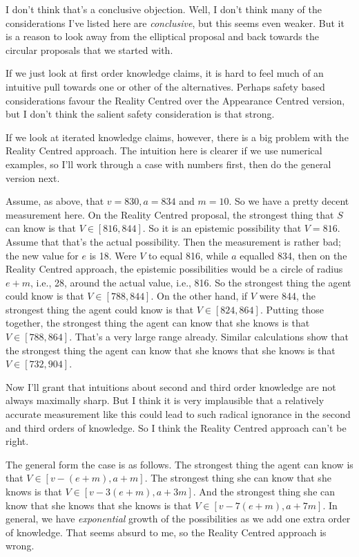 I don't think that's a conclusive objection. Well, I don't think many of the considerations I've listed here are \textit{conclusive}, but this seems even weaker. But it is a reason to look away from the elliptical proposal and back towards the circular proposals that we started with.

If we just look at first order knowledge claims, it is hard to feel much of an intuitive pull towards one or other of the alternatives. Perhaps safety based considerations favour the Reality Centred over the Appearance Centred version, but I don't think the salient safety consideration is that strong.

If we look at iterated knowledge claims, however, there is a big problem with the Reality Centred approach. The intuition here is clearer if we use numerical examples, so I'll work through a case with numbers first, then do the general version next.

Assume, as above, that $v = 830, a = 834$ and $m = 10$. So we have a pretty decent measurement here. On the Reality Centred proposal, the strongest thing that $S$ can know is that $V \in [816, 844]$. So it is an epistemic possibility that $V = 816$. Assume that that's the actual possibility. Then the measurement is rather bad; the new value for $e$ is 18. Were $V$ to equal 816, while $a$ equalled 834, then on the Reality Centred approach, the epistemic possibilities would be a circle of radius $e+m$, i.e., 28, around the actual value, i.e., 816. So the strongest thing the agent could know is that $V \in [788, 844]$. On the other hand, if $V$ were 844, the strongest thing the agent could know is that $V \in [824, 864]$. Putting those together, the strongest thing the agent can know that she knows is that $V \in [788, 864]$. That's a very large range already. Similar calculations show that the strongest thing the agent can know that she knows that she knows is that $V \in [732, 904]$.

Now I'll grant that intuitions about second and third order knowledge are not always maximally sharp. But I think it is very implausible that a relatively accurate measurement like this could lead to such radical ignorance in the second and third orders of knowledge. So I think the Reality Centred approach can't be right.

The general form the case is as follows. The strongest thing the agent can know is that $V \in [v - (e + m), a + m]$. The strongest thing she can know that she knows is that $V \in [v - 3(e + m), a + 3m]$. And the strongest thing she can know that she knows that she knows is that $V \in [v - 7(e + m), a + 7m]$. In general, we have \textit{exponential} growth of the possibilities as we add one extra order of knowledge. That seems absurd to me, so the Reality Centred approach is wrong.

